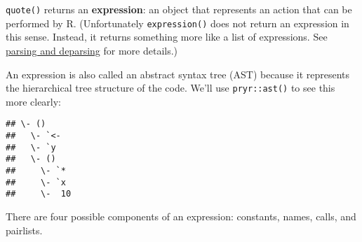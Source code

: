\texttt{quote()} returns an \textbf{expression}: an object that
represents an action that can be performed by R. (Unfortunately
\texttt{expression()} does not return an expression in this sense.
Instead, it returns something more like a list of expressions. See
\protect\hyperlink{parsing-and-deparsing}{parsing and deparsing} for
more details.) 

An expression is also called an abstract syntax tree (AST) because it
represents the hierarchical tree structure of the code. We'll use
\texttt{pryr::ast()} to see this more clearly:
 

\begin{Shaded}
\begin{Highlighting}[]
\StringTok{ }\OperatorTok{*}\StringTok{ }\NormalTok{)}
\end{Highlighting}
\end{Shaded}

\begin{verbatim}
## \- ()
##   \- `<-
##   \- `y
##   \- ()
##     \- `*
##     \- `x
##     \-  10
\end{verbatim}

There are four possible components of an expression: constants, names,
calls, and pairlists.

